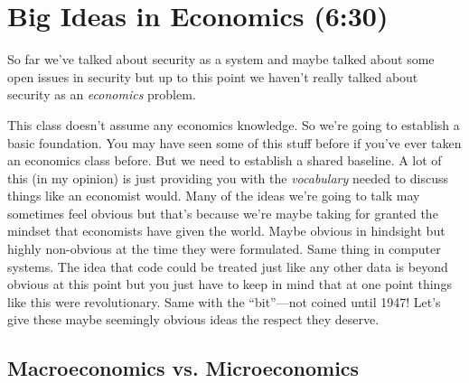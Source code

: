 \documentclass[11pt]{article}
\begin{document}



\section{Big Ideas in Economics (6:30)}

So far we've talked about security as a system and maybe talked about some open issues in security but up to this point we haven't really talked about security as an {\it economics} problem.

This class doesn't assume any economics knowledge. So we're going to establish a basic foundation.
You may have seen some of this stuff before if you've ever taken an economics class before.
But we need to establish a shared baseline. A lot of this (in my opinion) is just providing you with the {\it vocabulary} needed to discuss things like an economist would. Many of the ideas we're going to talk may sometimes feel obvious but that's because we're maybe taking for granted the mindset that economists have given the world. Maybe obvious in hindsight but highly non-obvious at the time they were formulated. Same thing in computer systems. The idea that code could be treated just like any other data is beyond obvious at this point but you just have to keep in mind that at one point things like this were revolutionary. Same with the ``bit''---not coined until 1947! Let's give these maybe seemingly obvious ideas the respect they deserve.


\subsection{Macroeconomics vs. Microeconomics}
\end{document}
